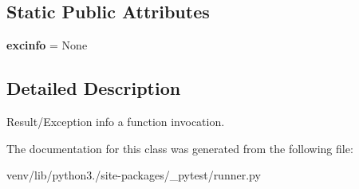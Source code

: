 \subsection*{Static Public Attributes}
\begin{DoxyCompactItemize}
\item 
\mbox{\label{class__pytest_1_1runner_1_1_call_info_ad6879940ccd56fcd7a46520d9d93372f}} 
{\bfseries excinfo} = None
\end{DoxyCompactItemize}


\subsection{Detailed Description}
\begin{DoxyVerb}Result/Exception info a function invocation. \end{DoxyVerb}
 

The documentation for this class was generated from the following file\+:\begin{DoxyCompactItemize}
\item 
venv/lib/python3./site-\/packages/\+\_\+pytest/runner.\+py\end{DoxyCompactItemize}

